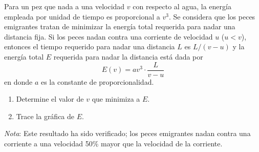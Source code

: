 \item Para un pez que nada a una velocidad $v$ con respecto al agua, la energía empleada por unidad de tiempo es proporcional a $v^3$. Se considera que los peces emigrantes tratan de minimizar la energía total requerida para nadar una distancia fija. Si los peces nadan contra una corriente de velocidad $u$ ($u < v$), entonces el tiempo requerido para nadar una distancia $L$ es $L/(v - u)$ y la energía total $E$ requerida para nadar la distancia está dada por
$$E(v) = a v^3 \cdot \frac{L}{v - u}$$
en donde $a$ es la constante de proporcionalidad.
\begin{enumerate}
    \item[(a)] Determine el valor de $v$ que minimiza a $E$.
    \item[(b)] Trace la gráfica de $E$.
\end{enumerate}
\textit{Nota}: Este resultado ha sido verificado; los peces emigrantes nadan contra una corriente a una velocidad 50\% mayor que la velocidad de la corriente.
